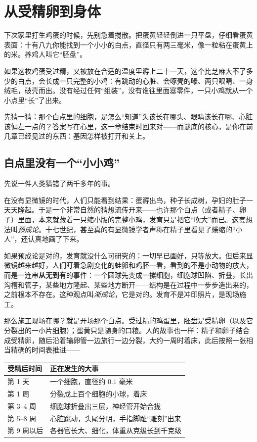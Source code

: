 \chapter{从受精卵到身体}

\begin{kaichang}
下次家里打生鸡蛋的时候，先别急着搅散。把蛋黄轻轻倒进一只平盘，仔细看蛋黄表面：十有八九你能找到一个小小的白点，直径只有两三毫米，像一粒粘在蛋黄上的米。养鸡人叫它“胚盘”。

如果这枚鸡蛋受过精，又被放在合适的温度里孵上二十一天，这个比芝麻大不了多少的白点，会长成一只完整的小鸡：有跳动的心脏、会啄壳的喙、两只眼睛、一身绒毛，破壳而出。没有经过任何“组装”，没有谁往里面塞零件，一只小鸡就从一个小点里“长”了出来。

先猜一猜：那个白点里的细胞，是怎么“知道”头该长在哪头、眼睛该长在哪、心脏该偏左一点的？答案写在心里，这一章结束时回来对——而谜底的核心，是你在前几章已经见过的东西：基因怎样被打开和关上。
\end{kaichang}

\section{白点里没有一个“小小鸡”}

先说一件人类猜错了两千多年的事。

在没有显微镜的时代，人们只能看到结果：蛋孵出鸟，种子长成树，孕妇的肚子一天天隆起。于是一个非常自然的猜想流传开来——也许那个白点（或者精子、卵子）里面，本来就藏着一只缩小版的完整小鸡，发育只是把它“吹大”而已。这套想法叫\emph{预成论}。十七世纪，甚至真的有显微镜学者声称在精子里看见了蜷缩的“小人”，还认真地画了下来。

如果预成论是对的，发育就没什么可研究的：一切早已画好，只等放大。但后来显微镜越来越好，人们盯着急剧变化的蛙卵和鸡胚一看，看到的不是小动物的放大，而是一连串\textbf{从无到有}的事件：一个圆球先变成一摞细胞，细胞球凹陷、折叠，长出沟槽和管子，某些地方隆起、某些地方断开——结构是在过程中一步步造出来的，之前根本不存在。这种观点叫\emph{渐成论}，它是对的。发育不是冲印照片，是现场施工。

那么施工现场在哪？就是开场那个白点。受过精的鸡蛋里，胚盘是受精卵（以及它分裂出的一小片细胞）；蛋黄只是随身的口粮。人的故事也一样：精子和卵子结合成受精卵，随后沿着输卵管一边旅行一边分裂，大约一周时着床，此后按照一张相当精确的时间表推进——

\begin{table}[htbp]
\centering
\begin{tabular}{ll}
\toprule
受精后时间 & 正在发生的大事 \\
\midrule
第 1 天 & 一个细胞，直径约 $0.1$ 毫米 \\
第 1 周 & 分裂成上百个细胞的小球，着床 \\
第 3--4 周 & 细胞球折叠出三层，神经管开始合拢 \\
第 5--8 周 & 心脏跳动，头尾分明，手指脚趾“雕刻”出来 \\
第 9 周以后 & 各器官长大、细化，体重从克级长到千克级 \\
\bottomrule
\end{tabular}
\end{table}

